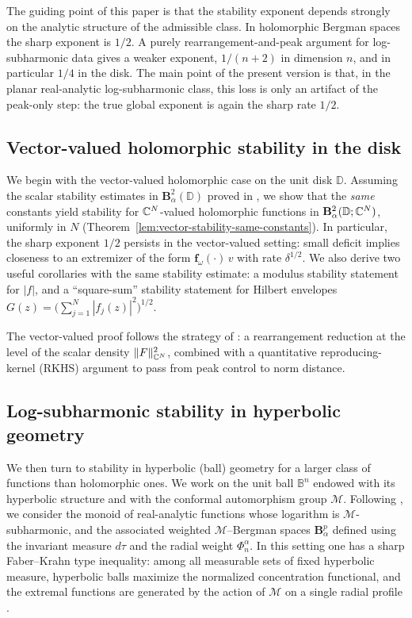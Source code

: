 \documentclass[a4paper,10pt]{amsart}
\newcommand{\D}{\mathbb{D}}
\begin{document}
The guiding point of this paper is that the stability exponent depends strongly
on the analytic structure of the admissible class. In holomorphic Bergman
spaces the sharp exponent is $1/2$. A purely rearrangement-and-peak argument
for log-subharmonic data gives a weaker exponent, $1/(n+2)$ in dimension $n$,
and in particular $1/4$ in the disk. The main point of the present version is
that, in the planar real-analytic log-subharmonic class, this loss is only an
artifact of the peak-only step: the true global exponent is again the sharp
rate $1/2$.

\subsection{Vector-valued holomorphic stability in the disk}

We begin with the vector-valued holomorphic case on the unit disk $\D$.
Assuming the scalar stability estimates in $\mathbf B_\alpha^2(\D)$ proved in
\cite{GomezKalajMelentijevicRamos2025}, we show that the \emph{same} constants yield stability for
$\mathbb{C}^N$-valued holomorphic functions in $\mathbf B_\alpha^2(\D;\C^N)$, uniformly in $N$
(Theorem~\ref{lem:vector-stability-same-constants}). In particular, the sharp exponent $1/2$
persists in the vector-valued setting:
small deficit implies closeness to an extremizer of the form $\mathbf f_\omega(\cdot)\,v$ with rate
$\delta^{1/2}$. We also derive two useful corollaries with the same stability estimate: a modulus
stability statement for $|f|$, and a ``square-sum'' stability statement for Hilbert envelopes
$G(z)=\big(\sum_{j=1}^N|f_j(z)|^2\big)^{1/2}$.

The vector-valued proof follows the strategy of \cite{GomezKalajMelentijevicRamos2025}:
a rearrangement reduction at the level of the scalar density $\|F\|_{\mathbb{C}^N}^2$, combined with a
quantitative reproducing-kernel (RKHS) argument to pass from peak control to norm distance.

\subsection{Log-subharmonic stability in hyperbolic geometry}

We then turn to stability in hyperbolic (ball) geometry for a larger class of functions than
holomorphic ones. We work on the unit ball $\mathbb B^n$ endowed with its hyperbolic structure and
with the conformal automorphism group $\mathcal M$. Following \cite{kalaj2024,kalajramos2024}, we
consider the monoid of real-analytic functions whose logarithm is $\mathcal M$-subharmonic, and the
associated weighted $\mathcal M$--Bergman spaces $\mathbf B_\alpha^p$ defined using the invariant
measure $d\tau$ and the radial weight $\Phi_n^\alpha$. In this setting one has a sharp Faber--Krahn
type inequality: among all measurable sets of fixed hyperbolic measure, hyperbolic balls maximize
the normalized concentration functional, and the extremal functions are generated by the action of
$\mathcal M$ on a single radial profile \cite{RamosTilli,kalajramos2024}.
\end{document}
